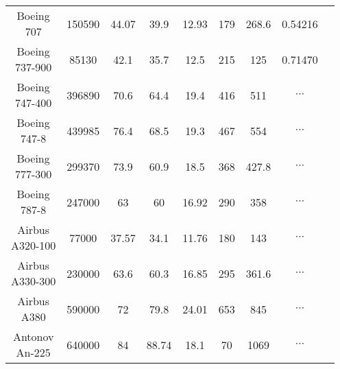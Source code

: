 \documentclass[a4paper,11pt]{article}
\makeatletter
\newcommand{\tabincell}[2]{\begin{tabular}{@{}#1@{}}#2\end{tabular}}
\makeatother
\begin{document}
\begin{spacing}{1.0}
\begin{enumerate}
\begin{center}
\begin{longtable}{ccccccccc}
		
		\tabincell{c}{Boeing\\ 707} &     150590 &      44.07 &       39.9 &      12.93 &        179 &      268.6 &   0.54216         \\
	
		\tabincell{c}{Boeing\\ 737-900} &      85130 &       42.1 &       35.7 &       12.5 &        215 &        125 &     0.71470       \\
		
		\tabincell{c}{Boeing\\ 747-400} &     396890 &       70.6 &       64.4 &       19.4 &        416 &        511 &  $\cdots $        \\
	
		\tabincell{c}{Boeing\\ 747-8} &     439985 &       76.4 &       68.5 &       19.3 &        467 &        554 &   $\cdots $         \\

		\tabincell{c}{Boeing\\ 777-300} &     299370 &       73.9 &       60.9 &       18.5 &        368 &      427.8 &  $\cdots $          \\
	
		\tabincell{c}{Boeing\\ 787-8} &     247000 &         63 &         60 &      16.92 &        290 &        358 &   $\cdots $         \\
	
		\tabincell{c}{Airbus \\ A320-100} &      77000 &      37.57 &       34.1 &      11.76 &        180 &        143 &  $\cdots $          \\
	
		\tabincell{c}{Airbus \\A330-300} &     230000 &       63.6 &       60.3 &      16.85 &        295 &      361.6 &  $\cdots $          \\
	
		\tabincell{c}{Airbus \\A380} &     590000 &         72 &       79.8 &      24.01 &        653 &        845 &  $\cdots $          \\
	
		\tabincell{c}{Antonov\\ An-225} &     640000 &         84 &      88.74 &       18.1 &         70 &       1069 &  $\cdots $          \\
	
		
		\end{longtable}  
	\end{center}
	

\end{enumerate}
\end{spacing}
\end{document}
